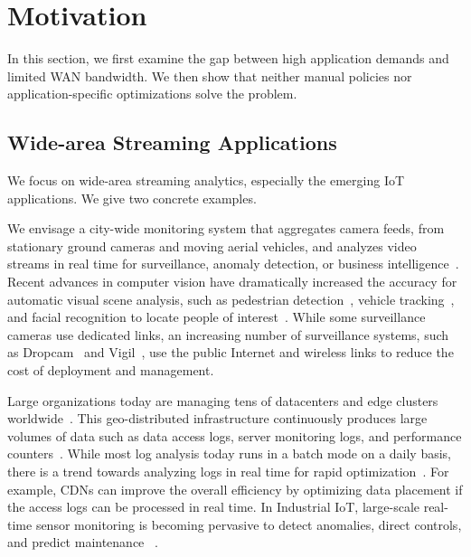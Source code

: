 \section{Motivation}
\label{sec:motivation}

In this section, we first examine the gap between high application demands and
limited WAN bandwidth. We then show that neither manual policies nor
application-specific optimizations solve the problem.

\subsection{Wide-area Streaming Applications}
\label{sec:wide-area-streaming}

We focus on wide-area streaming analytics, especially the emerging IoT
applications. We give two concrete examples.

 We envisage a city-wide monitoring system
that aggregates camera feeds, from stationary ground cameras and
moving aerial vehicles, and analyzes video streams in real time for
surveillance, anomaly detection, or business
intelligence~\cite{oh2011large}. Recent advances in computer vision
have dramatically increased the accuracy for automatic visual scene
analysis, such as pedestrian detection~\cite{dollar2012pedestrian},
vehicle tracking~\cite{coifman1998real}, and facial recognition to
locate people of interest~\cite{lu2015surpassing,
  parkhi2015deep}. While some surveillance cameras use dedicated
links, an increasing number of surveillance systems, such as
Dropcam~\cite{dropcam} and Vigil~\cite{zhang2015design}, use the
public Internet and wireless links to reduce the cost of deployment
and management.


 Large organizations today are managing tens of
datacenters and edge clusters worldwide~\cite{calder2013mapping}. This
geo-distributed infrastructure continuously produces large volumes of data such
as data access logs, server monitoring logs, and performance
counters~\cite{alspaugh2014analyzing, pu2015low, vulimiri2015global}. While most
log analysis today runs in a batch mode on a daily basis, there is a trend
towards analyzing logs in real time for rapid
optimization~\cite{rabkin2014aggregation}. For example, CDNs can improve the
overall efficiency by optimizing data placement if the access logs can be
processed in real time. In Industrial IoT, large-scale real-time sensor
monitoring is becoming pervasive to detect anomalies, direct controls, and
predict maintenance ~\cite{balani2016enterprise, ge}.

